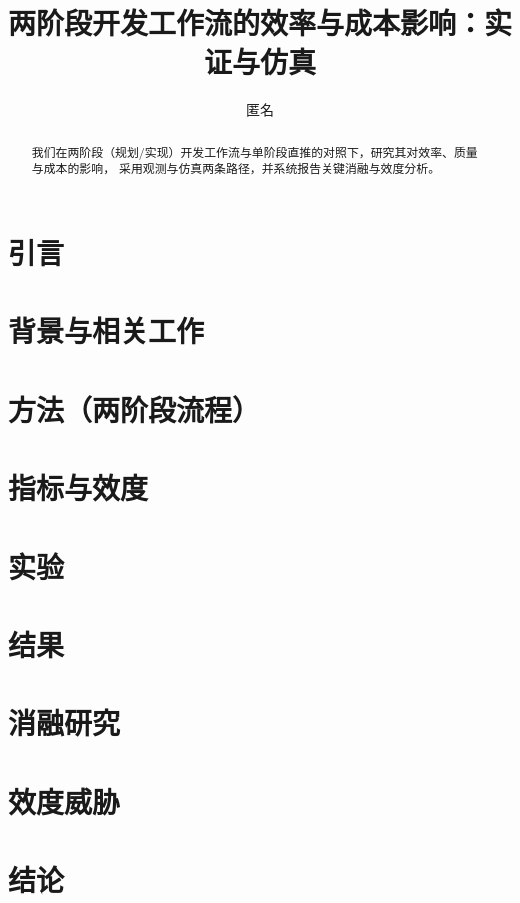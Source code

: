 \documentclass[UTF8]{ctexart}
\title{两阶段开发工作流的效率与成本影响：实证与仿真}
\author{匿名}
\date{}
\begin{document}
\maketitle

\begin{abstract}
我们在两阶段（规划/实现）开发工作流与单阶段直推的对照下，研究其对效率、质量与成本的影响，
采用观测与仿真两条路径，并系统报告关键消融与效度分析。
\end{abstract}

\section{引言}

\section{背景与相关工作}

\section{方法（两阶段流程）}

\section{指标与效度}

\section{实验}

\section{结果}

\section{消融研究}

\section{效度威胁}

\section{结论}



\end{document}
